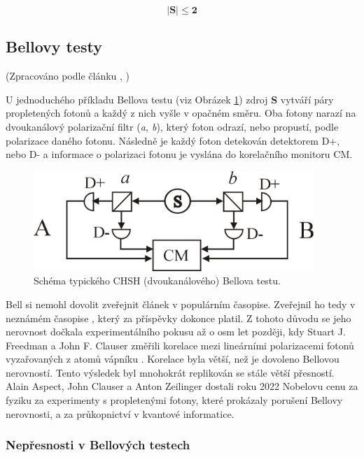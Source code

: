\begin{equation}
    \bm{|S| \leq 2}
    \label{eq:6}
\end{equation}

\clearpage

\subsection{Bellovy testy}
(Zpracováno podle článku , \cite*{belltest})

U jednoduchého příkladu Bellova testu (viz Obrázek \ref{fig:6}) zdroj \textbf{S} vytváří páry propletených fotonů a každý z nich vyšle v opačném směru. Oba fotony narazí na dvoukanálový polarizační filtr (\emph{a, b}), který foton odrazí, nebo propustí, podle polarizace daného fotonu. Následně je každý foton detekován detektorem D+, nebo D- a informace o polarizaci fotonu je vyslána do korelačního monitoru CM.

\begin{figure}[ht]
    \centering
    \includegraphics[width=300pt]{images/Two_channel.png}
    \caption{\label{fig:6}Schéma typického CHSH (dvoukanálového) Bellova testu.}
\end{figure}

Bell si nemohl dovolit zveřejnit článek v populárním časopise. Zveřejnil ho tedy v neznámém časopise , který za příspěvky dokonce platil. Z tohoto důvodu se jeho nerovnost dočkala experimentálního pokusu až o osm let později, kdy Stuart J. Freedman a John F. Clauser změřili korelace mezi lineárními polarizacemi fotonů vyzařovaných z atomů vápníku \parencite*{belltest:1}. Korelace byla větší, než je dovoleno Bellovou nerovností. Tento výsledek byl mnohokrát replikován se stále větší přesností. Alain Aspect, John Clauser a Anton Zeilinger dostali roku 2022 Nobelovu cenu za fyziku za experimenty s propletenými fotony, které prokázaly porušení Bellovy nerovnosti, a za průkopnictví v kvantové informatice.

\subsubsection{Nepřesnosti v Bellových testech}

